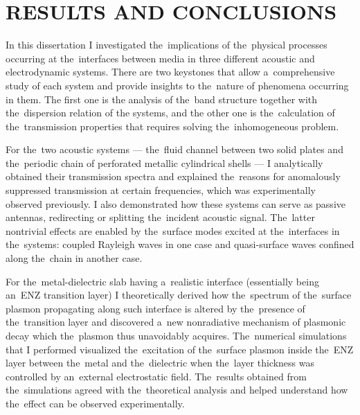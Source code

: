 \chapter{RESULTS AND CONCLUSIONS}

In this dissertation I investigated the~implications of the~physical processes occurring at the~interfaces between media in three different acoustic and electrodynamic systems.
There are two keystones that allow a~comprehensive study of each system and provide insights to the~nature of phenomena occurring in them.
The first one is the analysis of the~band structure together with the~dispersion relation of the systems, and the other one is the~calculation of the~transmission properties that requires solving the~inhomogeneous problem.

For the~two acoustic systems --- the~fluid channel between two solid plates and the~periodic chain of perforated metallic cylindrical shells --- I analytically obtained their transmission spectra and explained the~reasons for anomalously suppressed transmission at certain frequencies, which was experimentally observed previously.
I also demonstrated how these systems can serve as passive antennas, redirecting or splitting the~incident acoustic signal.
The~latter nontrivial effects are enabled by the~surface modes excited at the~interfaces in the~systems: coupled Rayleigh waves in one case and quasi-surface waves confined along the~chain in another case.

For the~metal-dielectric slab having a~realistic interface (essentially being an~ENZ transition layer) I theoretically derived how the~spectrum of the~surface plasmon propagating along such interface is altered by the~presence of the~transition layer and discovered a~new nonradiative mechanism of plasmonic decay which the~plasmon thus unavoidably acquires.
The~numerical simulations that I performed visualized the~excitation of the~surface plasmon inside the~ENZ layer between the~metal and the~dielectric when the~layer thickness was controlled by an~external electrostatic field.
The~results obtained from the~simulations agreed with the~theoretical analysis and helped understand how the~effect can be observed experimentally.

